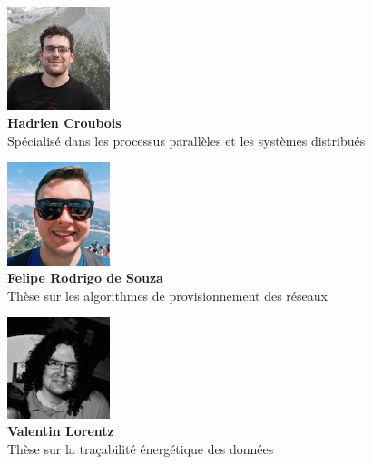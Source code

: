 \begin{figure}[h!]
	\begin{minipage}{0.33\textwidth}
		\centering
		\includegraphics[height=3cm]{partie1/images/hadrien.jpeg}\\
		\textbf{Hadrien Croubois}\\
		Spécialisé dans les processus parallèles et les systèmes distribués
	\end{minipage}\hfill
	\begin{minipage}{0.33\textwidth}
		\centering
		\includegraphics[width=3cm]{partie1/images/felipe.jpg}\\
		\textbf{Felipe Rodrigo de Souza}\\
		Thèse sur les algorithmes de provisionnement des réseaux
	\end{minipage}\hfill
	\begin{minipage}{0.33\textwidth}
		\centering
		\includegraphics[width=3cm]{partie1/images/valentin.jpg}\\
		\textbf{Valentin Lorentz}\\
		Thèse sur la traçabilité énergétique des données
	\end{minipage}
\end{figure}

